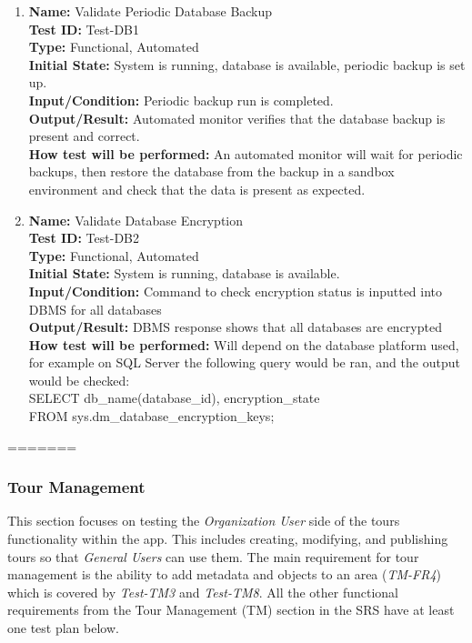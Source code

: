 \documentclass[12pt, titlepage]{article}
\begin{document}
\begin{enumerate}

\item \textbf{Name:} Validate Periodic Database Backup \label{itm:Test-DB1} \\
    \textbf{Test ID:} Test-DB1 \\
    \textbf{Type:} Functional, Automated \\
    \textbf{Initial State:} System is running, database is available, periodic backup is set up. \\
    \textbf{Input/Condition:} Periodic backup run is completed.  \\
    \textbf{Output/Result:} Automated monitor verifies that the database backup is present and correct.  \\
    \textbf{How test will be performed:} An automated monitor will wait for periodic backups, then restore the database from the backup in a sandbox environment and check that the data is present as expected.

\item \textbf{Name:} Validate Database Encryption \label{itm:Test-DB2} \\
    \textbf{Test ID:} Test-DB2 \\
    \textbf{Type:} Functional, Automated \\
    \textbf{Initial State:} System is running, database is available. \\
    \textbf{Input/Condition:} Command to check encryption status is inputted into DBMS for all databases \\
    \textbf{Output/Result:} DBMS response shows that all databases are encrypted \\
    \textbf{How test will be performed:} Will depend on the database platform used, for example on SQL Server the following query would be ran, and the output would be checked: \\
    SELECT db\_name(database\_id), encryption\_state \\
    FROM sys.dm\_database\_encryption\_keys;

\end{enumerate}

=======
\subsubsection{Tour Management}

This section focuses on testing the \textit{Organization User} side of the tours functionality within the app. This includes creating, modifying, and publishing tours so that \textit{General Users} can use them. The main requirement for tour management is the ability to add metadata and objects to an area (\textit{TM-FR4}) which is covered by \textit{Test-TM3} and \textit{Test-TM8}. All the other functional requirements from the Tour Management (TM) section in the SRS \cite{SRS} have at least one test plan below.
\end{document}
